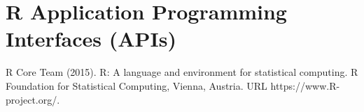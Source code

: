 \section{R Application Programming Interfaces (APIs)}



\begin{thebibliography}{00}

R Core Team (2015). 
\newblock R: A language and environment for statistical computing. R Foundation for Statistical Computing, Vienna, Austria.
\newblock URL https://www.R-project.org/.

\end{thebibliography}

